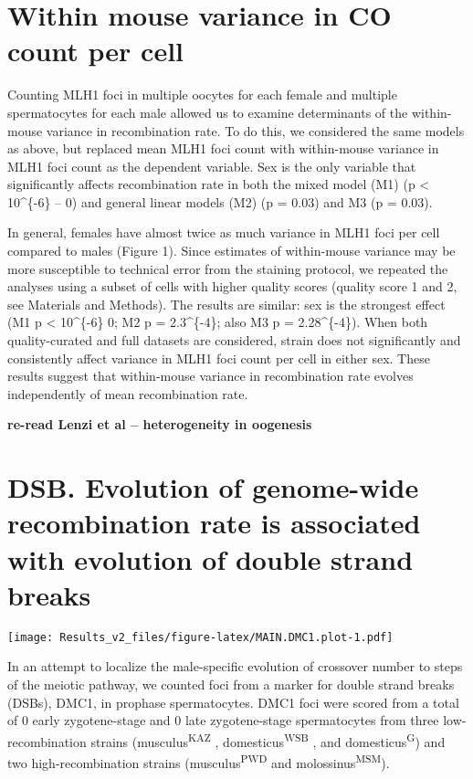 \documentclass[]{article}
\begin{document}
\section{Within mouse variance in CO count per
cell}\label{within-mouse-variance-in-co-count-per-cell}

Counting MLH1 foci in multiple oocytes for each female and multiple
spermatocytes for each male allowed us to examine determinants of the
within-mouse variance in recombination rate. To do this, we considered
the same models as above, but replaced mean MLH1 foci count with
within-mouse variance in MLH1 foci count as the dependent variable. Sex
is the only variable that significantly affects recombination rate in
both the mixed model (M1) (p \textless{} 10\^{}\{-6\} -- 0) and general
linear models (M2) (p = 0.03) and M3 (p = 0.03).

In general, females have almost twice as much variance in MLH1 foci per
cell compared to males (Figure 1). Since estimates of within-mouse
variance may be more susceptible to technical error from the staining
protocol, we repeated the analyses using a subset of cells with higher
quality scores (quality score 1 and 2, see Materials and Methods). The
results are similar: sex is the strongest effect (M1 p \textless{}
10\^{}\{-6\} 0; M2 p = 2.3\^{}\{-4\}; also M3 p =
2.28\^{}\{-4\}). When both quality-curated and full datasets
are considered, strain does not significantly and consistently affect
variance in MLH1 foci count per cell in either sex. These results
suggest that within-mouse variance in recombination rate evolves
independently of mean recombination rate.

 \textbf{re-read Lenzi et al -- heterogeneity in oogenesis}

\section{DSB. Evolution of genome-wide recombination rate is associated
with evolution of double strand
breaks}\label{dsb.-evolution-of-genome-wide-recombination-rate-is-associated-with-evolution-of-double-strand-breaks}

\texttt{[image: Results\_v2\_files/figure-latex/MAIN.DMC1.plot-1.pdf]}

In an attempt to localize the male-specific evolution of crossover
number to steps of the meiotic pathway, we counted foci from a marker
for double strand breaks (DSBs), DMC1, in prophase spermatocytes. DMC1
foci were scored from a total of 0 early zygotene-stage and 0 late
zygotene-stage spermatocytes from three low-recombination strains
(musculus\textsuperscript{KAZ} , domesticus\textsuperscript{WSB} , and
domesticus\textsuperscript{G}) and two high-recombination strains
(musculus\textsuperscript{PWD} and molossinus\textsuperscript{MSM}).
\end{document}
